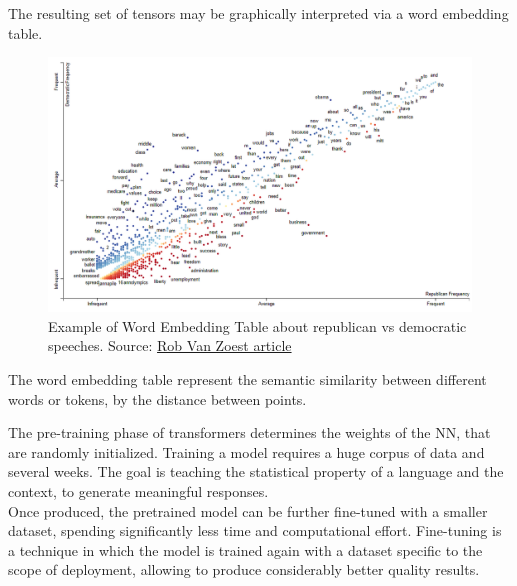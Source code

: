 \documentclass[12pt]{article}
\begin{document}
\vspace{2mm}

The resulting set of tensors may be graphically interpreted via a word embedding table.
    \begin{figure}[H]
    \centering
            \includegraphics[width=1.3\textwidth]{WordEmbeddingTableEx.png}
    \caption[Example of Word Embedding Table]{Example of Word Embedding Table about republican vs democratic speeches. Source: \href{https://www.innerdoc.com/periodic-table-of-nlp-tasks/78-word-embedding-visualization/}{Rob Van Zoest article}}
    \end{figure}
\noindent The word embedding table represent the semantic similarity between different words or tokens, by the distance between points.


\vspace{2mm}

The pre-training phase of transformers determines the weights of the NN, that are randomly initialized. Training a model requires a huge corpus of data and several weeks. The goal is teaching the statistical property of a language and the context, to generate meaningful responses.\\ 
Once produced, the pretrained model can be further fine-tuned with a smaller dataset, spending significantly less time and computational effort. Fine-tuning is a technique in which the model is trained again with a dataset specific to the scope of deployment, allowing to produce considerably better quality results.\\
\end{document}
